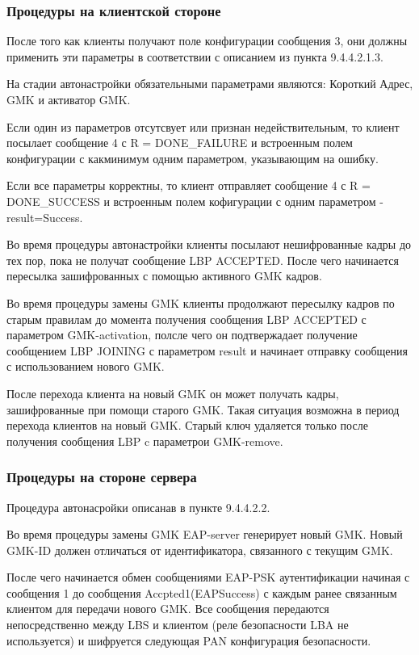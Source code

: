 \subsubsection{Процедуры на клиентской стороне}

После того как клиенты получают поле конфигурации сообщения 3, они должны применить эти параметры в соответствии с описанием из пункта 9.4.4.2.1.3.

На стадии автонастройки обязательными параметрами являются: Короткий Адрес, GMK и активатор GMK.

Если один из параметров отсутсвует или признан недействительным, то клиент посылает сообщение 4 с R = DONE\_FAILURE и встроенным полем конфигурации с какминимум одним параметром, указывающим на ошибку.

Если все параметры корректны, то клиент отправляет сообщение 4 с R = DONE\_SUCCESS и встроенным полем кофигурации с одним параметром - result=Success.

Во время процедуры автонастройки клиенты посылают нешифрованные кадры до тех пор, пока не получат сообщение LBP ACCEPTED. После чего начинается пересылка зашифрованных с помощью активного GMK кадров.

Во время процедуры замены GMK клиенты продолжают пересылку кадров по старым правилам до момента получения сообщения LBP ACCEPTED с параметром GMK-activation, полсле чего он подтвержадает получение сообщением LBP JOINING с параметром result и начинает отправку сообщения с использованием нового GMK.

После перехода клиента на новый GMK он может получать кадры, зашифрованные при помощи старого GMK. Такая ситуация возможна в период перехода клиентов на новый GMK. Старый ключ удаляется только после получения сообщения LBP c параметрои GMK-remove.

\subsubsection{Процедуры на стороне сервера}

Процедура автонасройки описанав в пункте 9.4.4.2.2.

Во время процедуры замены GMK EAP-server генерирует новый GMK. Новый GMK-ID должен отличаться от идентификатора, связанного с текущим GMK.

После чего начинается обмен сообщениями EAP-PSK аутентификации начиная с сообщения 1 до сообщения Accpted1(EAPSuccess) с каждым ранее связанным клиентом для передачи нового GMK. Все сообщения передаются непосредственно между LBS и клиентом (реле безопасности LBA не используется) и шифруется следующая PAN конфигурация безопасности.

